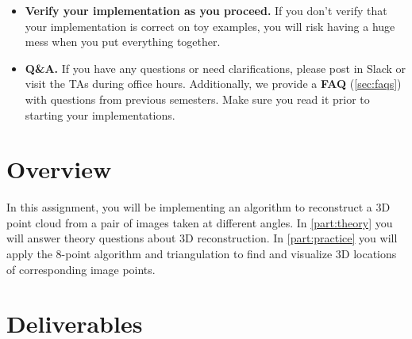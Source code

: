 \documentclass[11pt]{article}
\begin{document}
\begin{itemize}
\item {\bf Verify your implementation as you proceed.} If you don't verify that your implementation is correct on toy examples, you will risk having a huge mess when you put everything together. 

\item {\bf Q\&A.} If you have any questions or need clarifications, please post in Slack or visit the TAs during office hours. Additionally, we provide a \textbf{FAQ} (\autoref{sec:faqs}) with questions from previous semesters. Make sure you read it prior to starting your implementations.

\end{itemize}

\clearpage

\section*{Overview}\label{sec:overview}

In this assignment, you will be implementing an algorithm to reconstruct a 3D point cloud from a pair of images taken at different angles. In \autoref{part:theory} you will answer theory questions about 3D reconstruction. In \autoref{part:practice} you will apply the 8-point algorithm and triangulation to find and visualize 3D locations of corresponding image points.



\newpage


\newpage

\newpage

\newpage

\newpage



\section{Deliverables}
\end{document}
